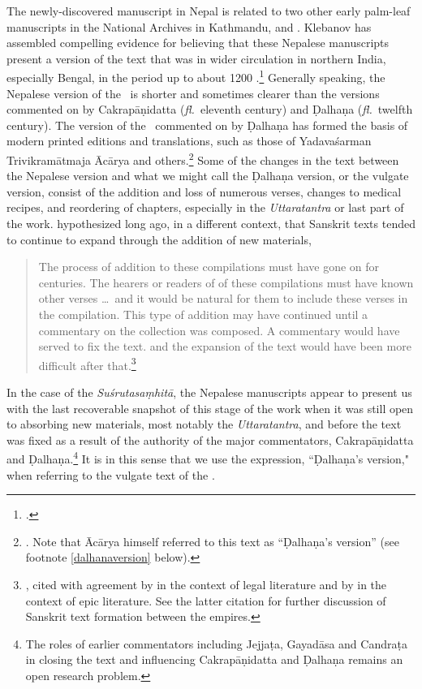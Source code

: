 The newly-discovered manuscript in Nepal is related to two other early palm-leaf
manuscripts in the National Archives in Kathmandu, 
and . Klebanov has assembled compelling evidence for
believing that these Nepalese manuscripts present a version of the text that was
in wider circulation in northern India, especially Bengal, in the period up to
about 1200 \CE.\footcite{kleb-2010,kleb-2021b} Generally speaking, the Nepalese
version of the \SS\ is shorter and sometimes clearer than the versions commented
on by Cakrapāṇidatta (\emph{fl.}\ eleventh century) and Ḍalhaṇa (\emph{fl.}\
twelfth century).  The version of the \SS\ commented on by Ḍalhaṇa has formed the
basis of modern printed editions and translations, such as those of Yadavaśarman
Trivikramātmaja Ācārya and others.\footnote{\cite{susr-trikamji1,vulgate,shar-susr}. Note 
that Ācārya himself referred to this text as “Ḍalhaṇa's version” (see footnote 
\ref{dalhanaversion} below).} 
Some of the changes in the text between the Nepalese version and what we might
call the Ḍalhaṇa version, or the vulgate version, consist of the addition and loss
of numerous verses, changes to medical recipes, and reordering of chapters,
especially in the \emph{Uttaratantra} or last part of the work. 
\citeauthor{lari-2003} hypothesized long ago, in a different context, that
Sanskrit texts tended to continue to expand through the addition of new materials,
\begin{quote}
The process of addition to these compilations must have gone on for centuries. The
hearers or readers of of these compilations must have known other verses \ldots\
and it would be natural for them to include these verses in the compilation. This
type of  addition may have continued until a commentary on the collection was
composed.   A commentary would have served to fix the text. and the expansion of
the text would have been more difficult after
that.\footnote{\cite[xii]{lari-2003}, cited with agreement by
    \citet[51]{oliv-manu} in the context of legal literature and by
    \citet[62--63]{bron-how} in the context of epic literature.  See the latter
    citation for further discussion of Sanskrit text formation between the empires. 
    }
\end{quote}
In the case of the \emph{Suśrutasaṃhitā}, the Nepalese manuscripts appear to present us 
with the last recoverable snapshot of this stage of the work when it was still open to 
absorbing new materials, most notably the \emph{Uttaratantra}, and before the text was 
fixed as a result of the authority of the major commentators, Cakrapāṇidatta and 
Ḍalhaṇa.\footnote{The roles of earlier commentators including Jejjaṭa, Gayadāsa and 
Candraṭa in closing the text and influencing Cakrapāṇidatta and Ḍalhaṇa remains an open 
research problem.}  It is in this sense that we use the expression, ``Ḍalhaṇa's version," when 
referring to the vulgate text of the \SS.


